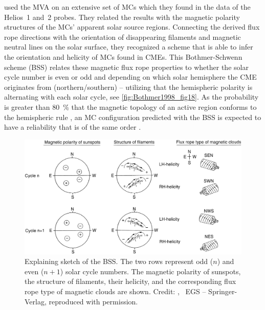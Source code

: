 \citet{Bothmer1998} used the MVA on an extensive set of MCs which they found in the data of the Helios~1 and~2 probes. They related the results with the magnetic polarity structures of the MCs' apparent solar source regions. Connecting the derived flux rope directions with the orientation of disappearing filaments and magnetic neutral lines on the solar surface, they recognized a scheme that is able to infer the orientation and helicity of MCs found in CMEs. This Bothmer-Schwenn scheme (BSS) relates these magnetic flux rope properties to whether the solar cycle number is even or odd and depending on which solar hemisphere the CME originates from (northern/southern) -- utilizing that the hemispheric polarity is alternating with each solar cycle, see \autoref{fig:Bothmer1998_fig18}. As the probability is greater than \SI{80}{\percent} that the magnetic topology of an active region conforms to the hemispheric rule \citep{Wang2013}, an MC configuration predicted with the BSS is expected to have a reliability that is of the same order \citep{Savani2015}.
\begin{figure}[p]
	\centering
	\includegraphics[width=\textwidth]{figures_of_others/images/Bothmer1998_fig18.png}
	\caption[Credit: {\citet[Fig.~18]{Bothmer1998}}, \textcopyright~EGS -- Springer-Verlag, reproduced with permission.]
	{Explaining sketch of the BSS. The two rows represent odd ($n$) and even ($n + 1$) solar cycle numbers. The magnetic polarity of sunspots, the structure of filaments, their helicity, and the corresponding flux rope type of magnetic clouds are shown. Credit: {\citet[Fig.~18]{Bothmer1998}}, \textcopyright~EGS -- Springer-Verlag, reproduced with permission.}
	\label{fig:Bothmer1998_fig18}
\end{figure}


